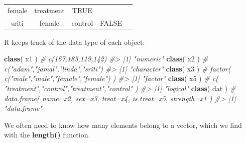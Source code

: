\documentclass[]{book}
\newenvironment{Shaded}{\begin{snugshade}}{\end{snugshade}}
\newcommand{\CommentTok}[1]{\textcolor[rgb]{0.56,0.35,0.01}{\textit{#1}}}
\newcommand{\KeywordTok}[1]{\textcolor[rgb]{0.13,0.29,0.53}{\textbf{#1}}}
\newcommand{\NormalTok}[1]{#1}
\theoremstyle{definition}
\theoremstyle{definition}
\theoremstyle{definition}
\theoremstyle{remark}
\begin{document}
\begin{longtable}[]{@{}ccccc@{}}
\begin{minipage}[t]{0.11\columnwidth}
female\strut
\end{minipage} & \begin{minipage}[t]{0.14\columnwidth}\centering
treatment\strut
\end{minipage} & \begin{minipage}[t]{0.13\columnwidth}\centering
TRUE\strut
\end{minipage} & \begin{minipage}[t]{0.13\columnwidth}\centering
119\strut
\end{minipage}\tabularnewline
\begin{minipage}[t]{0.10\columnwidth}\centering
sriti\strut
\end{minipage} & \begin{minipage}[t]{0.11\columnwidth}\centering
female\strut
\end{minipage} & \begin{minipage}[t]{0.14\columnwidth}\centering
control\strut
\end{minipage} & \begin{minipage}[t]{0.13\columnwidth}\centering
FALSE\strut
\end{minipage} & \begin{minipage}[t]{0.13\columnwidth}\centering
142\strut
\end{minipage}\tabularnewline
\bottomrule
\end{longtable}

R keeps track of the data type of each object:

\begin{Shaded}
\begin{Highlighting}[]
\KeywordTok{class}\NormalTok{( x1 )   }\CommentTok{# c(167,185,119,142)}
\CommentTok{#> [1] "numeric"}
\KeywordTok{class}\NormalTok{( x2 )   }\CommentTok{# c("adam","jamal","linda","sriti")}
\CommentTok{#> [1] "character"}
\KeywordTok{class}\NormalTok{( x3 )   }\CommentTok{# factor( c("male","male","female","female") )}
\CommentTok{#> [1] "factor"}
\KeywordTok{class}\NormalTok{( x5 )   }\CommentTok{# c( "treatment","control","treatment","control" )}
\CommentTok{#> [1] "logical"}
\KeywordTok{class}\NormalTok{( dat )  }\CommentTok{# data.frame( name=x2, sex=x3, treat=x4, is.treat=x5, strength=x1 )}
\CommentTok{#> [1] "data.frame"}
\end{Highlighting}
\end{Shaded}

We often need to know how many elements belong to a vector, which we
find with the \textbf{length()} function.
\end{document}

